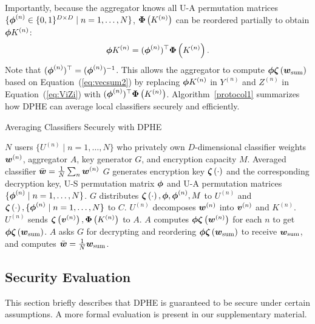 \documentclass[10pt,twocolumn,letterpaper]{article}
\def\sub#1{_{\rm #1}}
\def\vct#1{\mbox{\boldmath $#1$}}
\def\ui#1{^{(#1)}}
\def\perm{\vct{\phi}}
\def\he#1{\vct{\zeta}\left(#1\right)}
\def\dperm#1{\vct{\Phi}\left(#1\right)}
\begin{document}
Importantly, because the aggregator knows all U-A permutation matrices $\{\perm\ui{n}\in\{0, 1\}^{D\times D}\mid n= 1,\dots,N\}$, $\dperm{K\ui{n}}$ can be reordered partially to obtain $\perm K\ui{n}$: 
\begin{equation}
\perm K\ui{n} = (\perm\ui{n})^\top \dperm{K\ui{n}}.
\end{equation}
Note that $(\perm\ui{n})^\top=(\perm\ui{n})^{-1}$. This allows the aggregator to compute $\perm\he{\vct{w}\sub{sum}}$ based on Equation~(\ref{eq:vecsum2}) by replacing $\perm K\ui{n}$ in $Y\ui{n}$ and $Z\ui{n}$ in Equation~(\ref{eq:ViZi}) with $(\perm\ui{n})^\top \dperm{K\ui{n}}$.
Algorithm~\ref{protocol1} summarizes how DPHE can average local classifiers securely and efficiently.

\begin{algorithm}[t]
\caption{Averaging Classifiers Securely with DPHE}
\label{protocol1}
\begin{algorithmic}[1]
\REQUIRE $N$ users $\{U\ui{n}\mid n=1,\dots,N\}$ who privately own $D$-dimensional classifier weights $\vct{w}\ui{n}$, aggregator $A$, key generator $G$, and encryption capacity $M$.
\ENSURE Averaged classifier $\bar{\vct{w}}=\frac{1}{N}\sum_n\vct{w}\ui{n}$
\STATE $G$ generates encryption key $\he{\cdot}$ and the corresponding decryption key, U-S permutation matrix $\perm$ and U-A permutation matrices $\{\perm\ui{n}\mid n=1,\dots,N\}$.
\STATE $G$ distributes $\he{\cdot},\perm,\perm\ui{n}, M$ to $U\ui{n}$ and $\he{\cdot},\{\perm\ui{n}\mid n=1,\dots,N\}$ to $C$.
\STATE $U\ui{n}$ decomposes $\vct{w}\ui{n}$ into $\vct{v}\ui{n}$ and $K\ui{n}$. %
\STATE $U\ui{n}$ sends $\he{\vct{v}\ui{n}}, \dperm{K\ui{n}}$ to $A$.
\STATE $A$ computes $\perm\he{\vct{w}\ui{n}}$ for each $n$ to get $\perm\he{\vct{w}\sub{sum}}$. %
\STATE $A$ asks $G$ for decrypting and reordering $\perm\he{\vct{w}\sub{sum}}$ to receive $\vct{w}\sub{sum}$, and computes $\bar{\vct{w}}=\frac{1}{N}\vct{w}\sub{sum}$.
\end{algorithmic}
\end{algorithm}

\subsection{Security Evaluation}
\label{sec:proof}
This section briefly describes that DPHE is guaranteed to be secure under certain assumptions. A more formal evaluation is present in our supplementary material.
\end{document}
